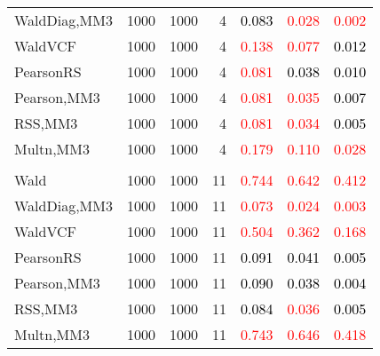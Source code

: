 \documentclass[
]{article}
\begin{document}
\begin{table}[H]
{\begin{tabular}[t]{lrrrrrr}
\hspace{1em}WaldDiag,MM3 & 1000 & 1000 & 4 & \textcolor{black}{0.083} & \textcolor{red}{0.028} & \textcolor{red}{0.002}\\
\hspace{1em}WaldVCF & 1000 & 1000 & 4 & \textcolor{red}{0.138} & \textcolor{red}{0.077} & \textcolor{black}{0.012}\\
\hspace{1em}PearsonRS & 1000 & 1000 & 4 & \textcolor{red}{0.081} & \textcolor{black}{0.038} & \textcolor{black}{0.010}\\
\hspace{1em}Pearson,MM3 & 1000 & 1000 & 4 & \textcolor{red}{0.081} & \textcolor{red}{0.035} & \textcolor{black}{0.007}\\
\hspace{1em}RSS,MM3 & 1000 & 1000 & 4 & \textcolor{red}{0.081} & \textcolor{red}{0.034} & \textcolor{black}{0.005}\\
\hspace{1em}Multn,MM3 & 1000 & 1000 & 4 & \textcolor{red}{0.179} & \textcolor{red}{0.110} & \textcolor{red}{0.028}\\
\addlinespace[0.3em]
\multicolumn{7}{l}{\textbf{1F 15V}}\\
\hspace{1em}Wald & 1000 & 1000 & 11 & \textcolor{red}{0.744} & \textcolor{red}{0.642} & \textcolor{red}{0.412}\\
\hspace{1em}WaldDiag,MM3 & 1000 & 1000 & 11 & \textcolor{red}{0.073} & \textcolor{red}{0.024} & \textcolor{red}{0.003}\\
\hspace{1em}WaldVCF & 1000 & 1000 & 11 & \textcolor{red}{0.504} & \textcolor{red}{0.362} & \textcolor{red}{0.168}\\
\hspace{1em}PearsonRS & 1000 & 1000 & 11 & \textcolor{black}{0.091} & \textcolor{black}{0.041} & \textcolor{black}{0.005}\\
\hspace{1em}Pearson,MM3 & 1000 & 1000 & 11 & \textcolor{black}{0.090} & \textcolor{black}{0.038} & \textcolor{black}{0.004}\\
\hspace{1em}RSS,MM3 & 1000 & 1000 & 11 & \textcolor{black}{0.084} & \textcolor{red}{0.036} & \textcolor{black}{0.005}\\
\hspace{1em}Multn,MM3 & 1000 & 1000 & 11 & \textcolor{red}{0.743} & \textcolor{red}{0.646} & \textcolor{red}{0.418}\\

\end{tabular}}
\end{table}
\end{document}
